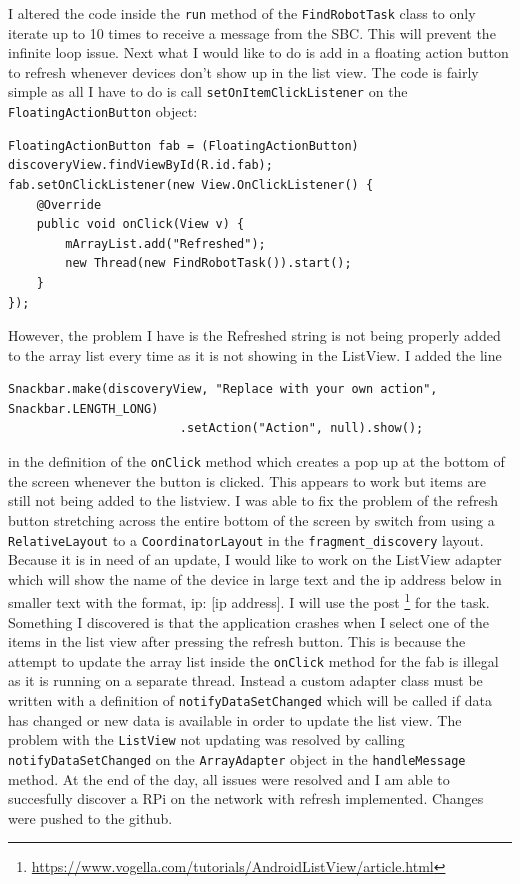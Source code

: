 \documentclass[fontsize=11pt, %
                             paper=a4, %
                             twoside, %
                             captions=tableheading,
                             index=totoc,
                             hyperref]{labbook}
\begin{document}
\begin{addmargin}[0cm]{0cm}
I altered the code inside the \texttt{run} method of the \texttt{FindRobotTask} class to only iterate up to 10 times to receive a message from the SBC. This will prevent the infinite loop issue. Next what I would like to do is add in a floating action button to refresh whenever devices don't show up in the list view. The code is fairly simple as all I have to do is call \texttt{setOnItemClickListener} on the \texttt{FloatingActionButton} object:
\begin{Verbatim}
FloatingActionButton fab = (FloatingActionButton) discoveryView.findViewById(R.id.fab);
fab.setOnClickListener(new View.OnClickListener() {
	@Override
	public void onClick(View v) {
		mArrayList.add("Refreshed");
		new Thread(new FindRobotTask()).start();
	}
});
\end{Verbatim}
However, the problem I have is the Refreshed string is not being properly added to the array list every time as it is not showing in the ListView. I added the line
\begin{Verbatim}
Snackbar.make(discoveryView, "Replace with your own action", Snackbar.LENGTH_LONG)
                        .setAction("Action", null).show();
\end{Verbatim}
in the definition of the \texttt{onClick} method which creates a pop up at the bottom of the screen whenever the button is clicked. This appears to work but items are still not being added to the listview. I was able to fix the problem of the refresh button stretching across the entire bottom of the screen by switch from using a \texttt{RelativeLayout} to a \texttt{CoordinatorLayout} in the \texttt{fragment\_discovery} layout. Because it is in need of an update, I would like to work on the ListView adapter which will show the name of the device in large text and the ip address below in smaller text with the format, ip: [ip address]. I will use the post \footnote{\url{https://www.vogella.com/tutorials/AndroidListView/article.html}} for the task.
\medbreak\noindent
Something I discovered is that the application crashes when I select one of the items in the list view after pressing the refresh button. This is because the attempt to update the array list inside the \texttt{onClick} method for the fab is illegal as it is running on a separate thread. Instead a custom adapter class must be written with a definition of \texttt{notifyDataSetChanged} which will be called if data has changed or new data is available in order to update the list view.
\medbreak\noindent
The problem with the \texttt{ListView} not updating was resolved by calling \texttt{notifyDataSetChanged} on the \texttt{ArrayAdapter} object in the \texttt{handleMessage} method. 
\medbreak\noindent
At the end of the day, all issues were resolved and I am able to succesfully discover a RPi on the network with refresh implemented. Changes were pushed to the github.
\end{addmargin}
\end{document}
